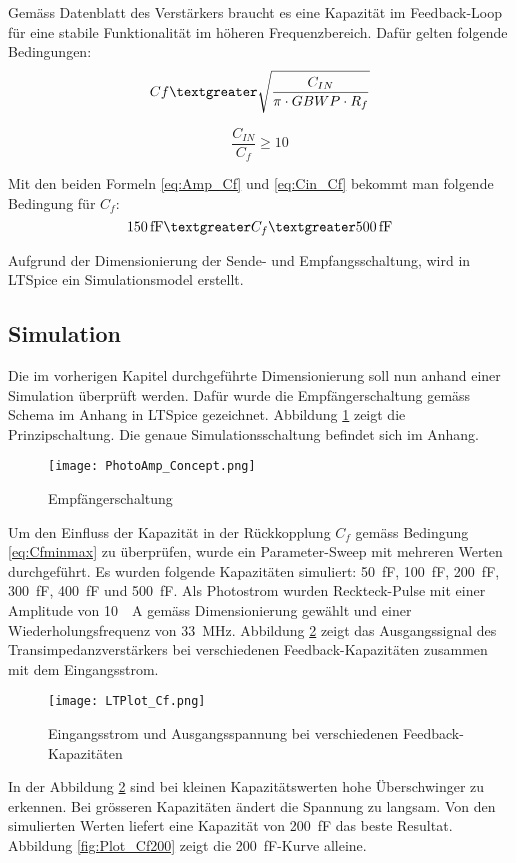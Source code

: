 Gemäss Datenblatt des Verstärkers braucht es eine Kapazität im Feedback-Loop für eine stabile Funktionalität im höheren Frequenzbereich. Dafür gelten folgende Bedingungen:
\begin{equation}\label{eq:Amp_Cf}
C{f}\textgreater \sqrt{\frac{C_{IN}}{\pi\cdot GBWP\cdot R_{f}}}
\end{equation}

\begin{equation}\label{eq:Cin_Cf}
\frac{C_{IN}}{C_{f}}\geq 10
\end{equation}

Mit den beiden Formeln \ref{eq:Amp_Cf} und \ref{eq:Cin_Cf} bekommt man folgende Bedingung für $C_{f}$: 
\begin{equation}\label{eq:Cfminmax}
\SI{150}{fF}\textgreater C_{f}\textgreater \SI{500}{fF}
\end{equation}

Aufgrund der Dimensionierung der Sende- und Empfangsschaltung, wird in LTSpice ein Simulationsmodel erstellt.

\subsection{Simulation}
Die im vorherigen Kapitel durchgeführte Dimensionierung soll nun anhand einer Simulation überprüft werden.
Dafür wurde die Empfängerschaltung gemäss Schema im Anhang in LTSpice gezeichnet. Abbildung \ref{fig:PhotoAmp_Concept} zeigt die Prinzipschaltung. Die genaue Simulationsschaltung befindet sich im Anhang.
\begin{figure}[h]
	\centering
	\texttt{[image: PhotoAmp\_Concept.png]}
	\caption{Empfängerschaltung}\label{fig:PhotoAmp_Concept}
\end{figure}

Um den Einfluss der Kapazität in der Rückkopplung $C_{f}$ gemäss Bedingung \ref{eq:Cfminmax} zu überprüfen, wurde ein Parameter-Sweep mit mehreren Werten durchgeführt. Es wurden folgende Kapazitäten simuliert: \SI{50}{fF}, \SI{100}{fF}, \SI{200}{fF}, \SI{300}{fF}, \SI{400}{fF} und \SI{500}{fF}. Als Photostrom wurden Reckteck-Pulse mit einer Amplitude von \SI{10}{\mu A} gemäss Dimensionierung gewählt und einer Wiederholungsfrequenz von \SI{33}{MHz}.
Abbildung \ref{fig:Plot_Cf} zeigt das Ausgangssignal des Transimpedanzverstärkers bei verschiedenen Feedback-Kapazitäten zusammen mit dem Eingangsstrom.
\begin{figure}[H]
	\centering
	\texttt{[image: LTPlot\_Cf.png]}
	\caption{Eingangsstrom und Ausgangsspannung bei verschiedenen Feedback-Kapazitäten}\label{fig:Plot_Cf}
\end{figure}
In der Abbildung \ref{fig:Plot_Cf} sind bei kleinen Kapazitätswerten hohe Überschwinger zu erkennen. Bei grösseren Kapazitäten ändert die Spannung zu langsam. Von den simulierten Werten liefert eine Kapazität von \SI{200}{fF} das beste Resultat. Abbildung \ref{fig:Plot_Cf200} zeigt die \SI{200}{fF}-Kurve alleine.

